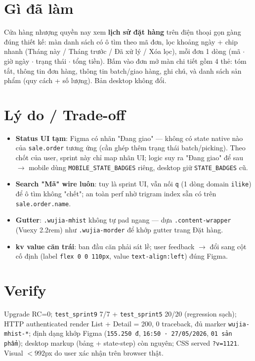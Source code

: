 \section{Gì đã làm}

Cửa hàng nhượng quyền nay xem \textbf{lịch sử đặt hàng} trên điện thoại gọn gàng
đúng thiết kế: màn danh sách có ô tìm theo mã đơn, lọc khoảng ngày + chip nhanh
(Tháng này / Tháng trước / Đã xử lý / Xóa lọc), mỗi đơn 1 dòng (mã \(\cdot\) giờ
ngày \(\cdot\) trạng thái \(\cdot\) tổng tiền). Bấm vào đơn mở màn chi tiết gồm 4
thẻ: tóm tắt, thông tin đơn hàng, thông tin batch/giao hàng, ghi chú, và danh sách
sản phẩm (quy cách + số lượng). Bản desktop không đổi.

\section{Lý do / Trade-off}

\begin{itemize}
  \item \textbf{Status UI tạm}: Figma có nhãn "Đang giao" --- không có state native
        nào của \texttt{sale.order} tương ứng (cần ghép thêm trạng thái
        batch/picking). Theo chốt của user, sprint này chỉ map nhãn UI; logic suy
        ra "Đang giao" để sau \(\rightarrow\) mobile dùng \texttt{MOBILE\_STATE\_BADGES}
        riêng, desktop giữ \texttt{STATE\_BADGES} cũ.
  \item \textbf{Search "Mã" wire luôn}: tuy là sprint UI, vẫn nối \texttt{q} (1 dòng
        domain \texttt{ilike}) để ô tìm không "chết"; an toàn perf nhờ trigram index
        sẵn có trên \texttt{sale.order.name}.
  \item \textbf{Gutter}: \texttt{.wujia-mhist} không tự pad ngang --- dựa
        \texttt{.content-wrapper} (Vuexy 2.2rem) như \texttt{.wujia-morder} để khớp
        gutter trang Đặt hàng.
  \item \textbf{kv value căn trái}: ban đầu căn phải sát lề; user feedback
        \(\rightarrow\) đổi sang cột cố định (label \texttt{flex 0 0 110px}, value
        \texttt{text-align:left}) đúng Figma.
\end{itemize}

\section{Verify}

Upgrade RC=0; \texttt{test\_sprint9} 7/7 + \texttt{test\_sprint5} 20/20 (regression
sạch); HTTP authenticated render List + Detail = 200, 0 traceback, đủ marker
\texttt{wujia-mhist-*}; định dạng khớp Figma (\texttt{155.250 đ},
\texttt{16:50 · 27/05/2026}, \texttt{01 sản phẩm}); desktop markup (bảng +
state-step) còn nguyên; CSS served \texttt{?v=1121}. Visual \(<992\)px do user xác
nhận trên browser thật.
